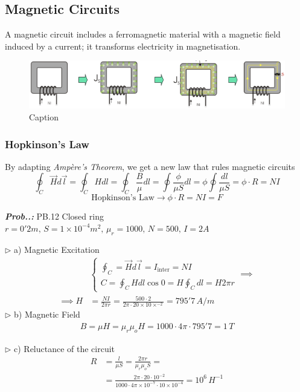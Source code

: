 \documentclass[a4paper]{article}
\begin{document}
\subsection{Magnetic Circuits}
\setcounter{equation}{0}
A magnetic circuit includes a ferromagnetic material with a magnetic field induced by a current; it transforms electricity in magnetisation.

\begin{figure}[H]
    \centering
    \includegraphics[width=\textwidth]{IMG/mag_circuit.png}
    \caption{Caption}
    \label{fig:enter-label}
\end{figure}

\subsubsection{Hopkinson's Law}
\setcounter{equation}{0}
By adapting \textit{Ampère's Theorem}, we get a new law that rules magnetic circuits
$$
\oint_{C}\vec{H}d\vec{l}=\oint_{C}Hdl=\oint_{C}\frac{B}{\mu}dl=\oint \frac{\phi}{\mu S}dl=\phi \oint \frac{dl}{\mu S}=\phi \cdot R=NI
$$
$$
\text{Hopkinson's Law}\to \boxed{\phi \cdot R=NI=F}
$$

\setcounter{equation}{0}
\vspace{2ex}\textbf{\textit{Prob.\thesection.\theprob: }}PB.12 Closed ring $r=0'2m,\,S=1\times10^{-4}m^{2},\,\mu_{r}=1000,\,N=500,\, I=2A$

$\triangleright$ a) Magnetic Excitation
\begin{align}
&\begin{cases}
\oint_{C}=\vec{H}d\vec{l}=I_{\text{inter}}=NI \\
C=\oint_{C}Hdl\cos 0=H\oint_{C}dl=H2\pi r
\end{cases}\implies  \\
\implies H&=\frac{NI}{2\pi r}=\frac{500\cdot 2}{2\pi \cdot20\times 10\times^{-2}}=\boxed{795'7\,A /m}
\end{align}
$\triangleright$ b) Magnetic Field
\begin{align}
B=\mu H=\mu_{r}\mu_{o}H=1000\cdot4\pi \cdot 795'7=1\,T
\end{align}

$\triangleright$ c) Reluctance of the circuit
\begin{align}
R&=\frac{l}{\mu S}=\frac{2\pi r}{\mu_{r}\mu_{o}S}= \\
&=\frac{2\pi \cdot 20\cdot 10^{-2}}{1000\cdot 4\pi \times 10^{-7}\cdot 10\times 10^{-4}}=\boxed{10^{6}\, H^{-1}}
\end{align}
\end{document}
